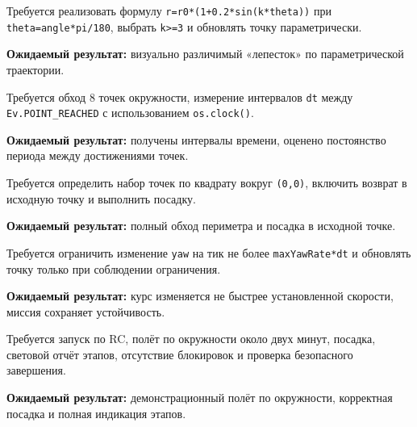\begin{taskbox}
Требуется реализовать формулу \texttt{r=r0*(1+0.2*sin(k*theta))} при \texttt{theta=angle*pi/180}, выбрать \texttt{k>=3} и обновлять точку параметрически.

\textbf{Ожидаемый результат:} визуально различимый «лепесток» по параметрической траектории.
\end{taskbox}

\begin{taskbox}
Требуется обход 8 точек окружности, измерение интервалов \texttt{dt} между \texttt{Ev.POINT\_REACHED} с использованием \texttt{os.clock()}.

\textbf{Ожидаемый результат:} получены интервалы времени, оценено постоянство периода между достижениями точек.
\end{taskbox}

\begin{taskbox}
Требуется определить набор точек по квадрату вокруг \texttt{(0,0)}, включить возврат в исходную точку и выполнить посадку.

\textbf{Ожидаемый результат:} полный обход периметра и посадка в исходной точке.
\end{taskbox}

\begin{taskbox}
Требуется ограничить изменение \texttt{yaw} на тик не более \texttt{maxYawRate*dt} и обновлять точку только при соблюдении ограничения.

\textbf{Ожидаемый результат:} курс изменяется не быстрее установленной скорости, миссия сохраняет устойчивость.
\end{taskbox}

\begin{taskbox}
Требуется запуск по RC, полёт по окружности около двух минут, посадка, световой отчёт этапов, отсутствие блокировок и проверка безопасного завершения.

\textbf{Ожидаемый результат:} демонстрационный полёт по окружности, корректная посадка и полная индикация этапов.
\end{taskbox}
